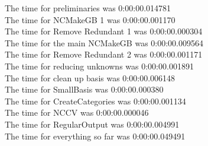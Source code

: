 \documentclass[rep10,leqno]{report}
\begin{document}
\noindent
The time for preliminaries was 0:00:00.014781\\
The time for NCMakeGB 1 was 0:00:00.001170\\
The time for Remove Redundant 1 was 0:00:00.000304\\
The time for the main NCMakeGB was 0:00:00.009564\\
The time for Remove Redundant 2 was 0:00:00.001171\\
The time for reducing unknowns was 0:00:00.001891\\
The time for clean up basis was 0:00:00.006148\\
The time for SmallBasis was 0:00:00.000380\\
The time for CreateCategories was 0:00:00.001134\\
The time for NCCV was 0:00:00.000046\\
The time for RegularOutput was 0:00:00.004991\\
The time for everything so far was 0:00:00.049491\\
\end{document}
